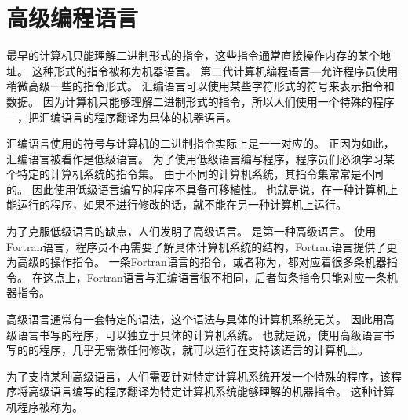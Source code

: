 \section{高级编程语言}
{
    最早的计算机只能理解二进制形式的指令，这些指令通常直接操作内存的某个地址。
    这种形式的指令被称为机器语言。
    第二代计算机编程语言---允许程序员使用稍微高级一些的指令形式。
    汇编语言可以使用某些字符形式的符号来表示指令和数据。
    因为计算机只能够理解二进制形式的指令，所以人们使用一个特殊的程序---，把汇编语言的程序翻译为具体的机器语言。

    汇编语言使用的符号与计算机的二进制指令实际上是一一对应的。
    正因为如此，汇编语言被看作是低级语言。
    为了使用低级语言编写程序，程序员们必须学习某个特定的计算机系统的指令集。
    由于不同的计算机系统，其指令集常常是不同的。
    因此使用低级语言编写的程序不具备可移植性。
    也就是说，在一种计算机上能运行的程序，如果不进行修改的话，就不能在另一种计算机上运行。

    为了克服低级语言的缺点，人们发明了高级语言。
    是第一种高级语言。
    使用Fortran语言，程序员不再需要了解具体计算机系统的结构，Fortran语言提供了更为高级的操作指令。
    一条Fortran语言的指令，或者称为，都对应着很多条机器指令。
    在这点上，Fortran语言与汇编语言很不相同，后者每条指令只能对应一条机器指令。

    高级语言通常有一套特定的语法，这个语法与具体的计算机系统无关。
    因此用高级语言书写的程序，可以独立于具体的计算机系统。
    也就是说，使用高级语言书写的的程序，几乎无需做任何修改，就可以运行在支持该语言的计算机上。

    为了支持某种高级语言，人们需要针对特定计算机系统开发一个特殊的程序，该程序将高级语言编写的程序翻译为特定计算机系统能够理解的机器指令。
    这种计算机程序被称为。
}

\endinput
